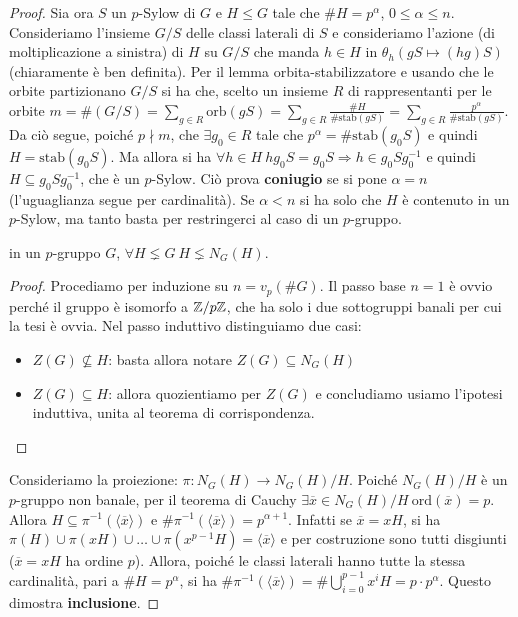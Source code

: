 \begin{proof}
    Sia ora $S$ un $p$-Sylow di $G$ e $H \leq G$ tale che $\#H = p^{\alpha}$, $0 \leq \alpha \leq n$. Consideriamo l'insieme $G/S$ delle classi laterali di $S$ e consideriamo l'azione (di moltiplicazione a sinistra) di $H$ su $G/S$ che manda $h \in H$ in $\theta_h(gS \mapsto (hg)S)$ (chiaramente è ben definita). Per il lemma orbita-stabilizzatore e usando che le orbite partizionano $G/S$ si ha che, scelto un insieme $R$ di rappresentanti per le orbite $m = \#(G/S) = \sum_{g \in R} \text{orb}(gS) = \sum_{g\in R} \frac{\#H}{\#\text{stab}(gS)} = \sum_{g\in R} \frac{p^{\alpha}}{\#\text{stab}(gS)}$. Da ciò segue, poiché $p \nmid m$, che $\exists g_0 \in R$ tale che $p^{\alpha} = \#\text{stab}(g_0S)$ e quindi $H = \text{stab}(g_0S)$. Ma allora si ha $\forall h \in H \ hg_0S = g_0S \Rightarrow h \in g_0 S g_0^{-1}$ e quindi $H \subseteq g_0Sg_0^{-1}$, che è un $p$-Sylow. Ciò prova \textbf{coniugio} se si pone $\alpha = n$ (l'uguaglianza segue per cardinalità).
    Se $\alpha < n$ si ha solo che $H$ è contenuto in un $p$-Sylow, ma tanto basta per restringerci al caso di un $p$-gruppo.
    \begin{lemma2}
        in un $p$-gruppo $G$, $\forall H \lneq G \ H \lneq N_G(H)$.
    \end{lemma2}
    \begin{proof}
        Procediamo per induzione su $n= v_p(\#G)$. Il passo base $n = 1$ è ovvio perché il gruppo è isomorfo a $\mathbb{Z}/p\mathbb{Z}$, che ha solo i due sottogruppi banali per cui la tesi è ovvia. Nel passo induttivo distinguiamo due casi: 
        \begin{itemize}
        \item $Z(G) \nsubseteq H$: basta allora notare  $Z(G) \subseteq N_G(H)$
        \item $Z(G) \subseteq H$: allora quozientiamo per $Z(G)$ e concludiamo usiamo l'ipotesi induttiva, unita al teorema di corrispondenza. 
        \end{itemize}
    \end{proof}
    Consideriamo la proiezione: $\pi: N_G(H) \rightarrow N_G(H)/H$. Poiché $N_G(H)/H$ è un $p$-gruppo non banale, per il teorema di Cauchy $\exists \overline x \in N_G(H)/H \ \text{ord}(\overline x) = p$. Allora $H \subseteq \pi^{-1}(\langle \overline x \rangle)$ e $\#\pi^{-1}(\langle \overline x \rangle) = p^{\alpha+1}$. Infatti se $\overline x = xH$, si ha $\pi(H)\cup \pi(xH)\cup\dots\cup\pi(x^{p-1}H) =  \langle \overline x \rangle$ e per costruzione sono tutti disgiunti ($\overline x = xH$ ha ordine $p$). Allora, poiché le classi laterali hanno tutte la stessa cardinalità, pari a $\#H = p^{\alpha}$, si ha $\#\pi^{-1}(\langle \overline x \rangle) = \#\bigcup_{i=0}^{p-1} x^iH = p\cdot p^{\alpha}$. Questo dimostra \textbf{inclusione}.
    

\end{proof}
